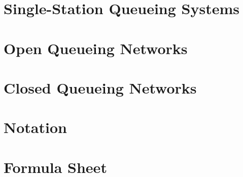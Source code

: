 \tableofcontents




\chapter{Single-Station Queueing Systems}
\label{cha:single-stat-queu}



















%
 



%


\chapter{Open Queueing Networks}
\label{sec:notes-relat-chapt2}




%


\chapter{Closed Queueing Networks}
\label{ch3}



%

%




\chapter*{Notation}
\label{sec:notation}


\chapter*{Formula Sheet}


\cleardoublepage
{}
{}
\printindex


